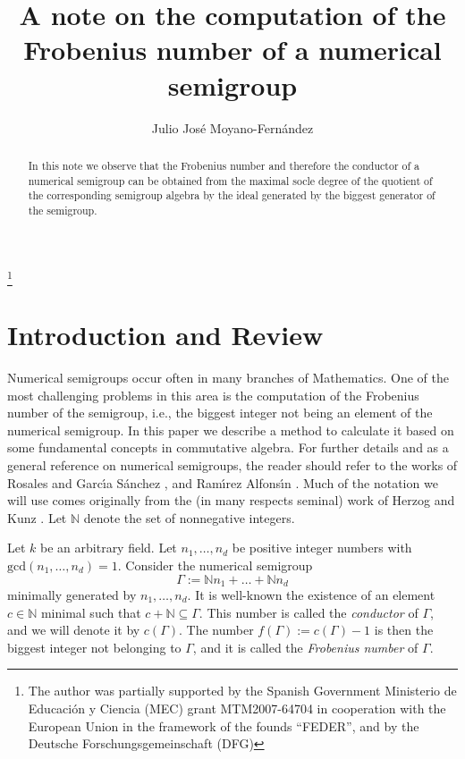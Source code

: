 \documentclass[12pt,reqno]{amsart}
\theoremstyle{definition}
\numberwithin{equation}{section}
\begin{document}
\title{A note on the computation of the \\ Frobenius number of a numerical semigroup}

\author{Julio Jos\'e Moyano-Fern\'andez}

\address{Universit\"at Osnabr\"uck, FB Mathematik/Informatik, 49069
Osnabr\"uck, Germany} 

\thanks{The author was partially supported by the Spanish Government Ministerio de Educaci\'on y Ciencia (MEC) grant MTM2007-64704 in cooperation with the European Union in the framework of the founds ``FEDER'', and by the Deutsche 
Forschungsgemeinschaft (DFG)}

\begin{abstract}
In this note we observe that the Frobenius number and therefore the conductor of a numerical semigroup can be obtained from the maximal socle degree of the quotient of the corresponding semigroup algebra by the ideal generated by the biggest generator of the semigroup.
\end{abstract}

\maketitle

\section{Introduction and Review} 

\noindent Numerical semigroups occur often in many branches of Mathematics. One of the most challenging problems in this area is the computation of the Frobenius number of the semigroup, i.e., the biggest integer not being an element of the numerical semigroup. In this paper we describe a method to calculate it based on some fundamental concepts in commutative algebra. For further details and as a general reference on numerical semigroups, the reader should refer to the works of Rosales and Garc\'{\i}a S\'{a}nchez \cite{buch}, and Ram\'{\i}rez Alfons\'{\i}n \cite{ramirez}. Much of the notation we will use comes originally from the (in many respects seminal) work of Herzog and Kunz \cite{hk}. Let $\mathbb{N}$ denote the set of nonnegative integers.
\medskip

\noindent Let $k$ be an arbitrary field. Let  $n_1, \ldots , n_d$ be positive integer numbers with $\mathrm{gcd}(n_1, \ldots , n_d)=1$. Consider the numerical semigroup 
\[
\Gamma:=\mathbb{N}n_1 + \ldots + \mathbb{N}n_d
\]
minimally generated by $n_1, \ldots , n_d$. It is well-known the existence of an element $c \in \mathbb{N}$ minimal such that $c + \mathbb{N} \subseteq \Gamma$. This number is called the \emph{conductor} of $\Gamma$, and we will denote it by $c(\Gamma)$. The number $f(\Gamma):=c(\Gamma)-1$ is then the biggest integer not belonging to $\Gamma$, and it is called the \emph{Frobenius number} of $\Gamma$.
\medskip
\end{document}
